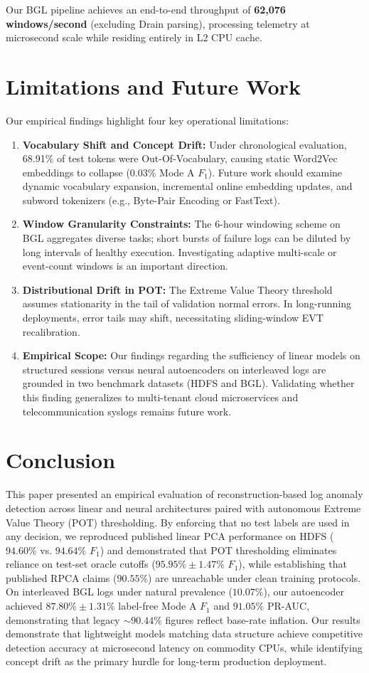 \documentclass[conference]{IEEEtran}
\begin{document}
Our BGL pipeline achieves an end-to-end throughput of \textbf{62,076 windows/second} (excluding Drain parsing), processing telemetry at microsecond scale while residing entirely in L2 CPU cache.

\section{Limitations and Future Work}
\label{sec:limitations}
Our empirical findings highlight four key operational limitations:
\begin{enumerate}
    \item \textbf{Vocabulary Shift and Concept Drift:} Under chronological evaluation, 68.91\% of test tokens were Out-Of-Vocabulary, causing static Word2Vec embeddings to collapse ($0.03\%$ Mode A $F_1$). Future work should examine dynamic vocabulary expansion, incremental online embedding updates, and subword tokenizers (e.g., Byte-Pair Encoding or FastText).
    \item \textbf{Window Granularity Constraints:} The 6-hour windowing scheme on BGL aggregates diverse tasks; short bursts of failure logs can be diluted by long intervals of healthy execution. Investigating adaptive multi-scale or event-count windows is an important direction.
    \item \textbf{Distributional Drift in POT:} The Extreme Value Theory threshold assumes stationarity in the tail of validation normal errors. In long-running deployments, error tails may shift, necessitating sliding-window EVT recalibration.
    \item \textbf{Empirical Scope:} Our findings regarding the sufficiency of linear models on structured sessions versus neural autoencoders on interleaved logs are grounded in two benchmark datasets (HDFS and BGL). Validating whether this finding generalizes to multi-tenant cloud microservices and telecommunication syslogs remains future work.
\end{enumerate}

\section{Conclusion}
\label{sec:conclusion}
This paper presented an empirical evaluation of reconstruction-based log anomaly detection across linear and neural architectures paired with autonomous Extreme Value Theory (POT) thresholding. By enforcing that no test labels are used in any decision, we reproduced published linear PCA performance on HDFS ($94.60\%$ vs. $94.64\%$ $F_1$) and demonstrated that POT thresholding eliminates reliance on test-set oracle cutoffs ($95.95\% \pm 1.47\%$ $F_1$), while establishing that published RPCA claims ($90.55\%$) are unreachable under clean training protocols. On interleaved BGL logs under natural prevalence ($10.07\%$), our autoencoder achieved $87.80\% \pm 1.31\%$ label-free Mode A $F_1$ and $91.05\%$ PR-AUC, demonstrating that legacy $\sim 90.44\%$ figures reflect base-rate inflation. Our results demonstrate that lightweight models matching data structure achieve competitive detection accuracy at microsecond latency on commodity CPUs, while identifying concept drift as the primary hurdle for long-term production deployment.



\end{document}
